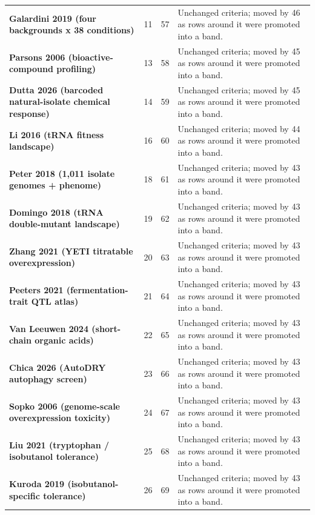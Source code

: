 \begin{longtable}{@{}L{46mm} r@{\hspace{6pt}} r@{\hspace{6pt}} L{104mm}@{}}
\addlinespace[5pt]
\textbf{Galardini 2019 (four backgrounds x 38 conditions)} & 11 & 57 & Unchanged criteria; moved by 46 as rows around it were promoted into a band. \\
\addlinespace[5pt]
\textbf{Parsons 2006 (bioactive-compound profiling)} & 13 & 58 & Unchanged criteria; moved by 45 as rows around it were promoted into a band. \\
\addlinespace[5pt]
\textbf{Dutta 2026 (barcoded natural-isolate chemical response)} & 14 & 59 & Unchanged criteria; moved by 45 as rows around it were promoted into a band. \\
\addlinespace[5pt]
\textbf{Li 2016 (tRNA fitness landscape)} & 16 & 60 & Unchanged criteria; moved by 44 as rows around it were promoted into a band. \\
\addlinespace[5pt]
\textbf{Peter 2018 (1,011 isolate genomes + phenome)} & 18 & 61 & Unchanged criteria; moved by 43 as rows around it were promoted into a band. \\
\addlinespace[5pt]
\textbf{Domingo 2018 (tRNA double-mutant landscape)} & 19 & 62 & Unchanged criteria; moved by 43 as rows around it were promoted into a band. \\
\addlinespace[5pt]
\textbf{Zhang 2021 (YETI titratable overexpression)} & 20 & 63 & Unchanged criteria; moved by 43 as rows around it were promoted into a band. \\
\addlinespace[5pt]
\textbf{Peeters 2021 (fermentation-trait QTL atlas)} & 21 & 64 & Unchanged criteria; moved by 43 as rows around it were promoted into a band. \\
\addlinespace[5pt]
\textbf{Van Leeuwen 2024 (short-chain organic acids)} & 22 & 65 & Unchanged criteria; moved by 43 as rows around it were promoted into a band. \\
\addlinespace[5pt]
\textbf{Chica 2026 (AutoDRY autophagy screen)} & 23 & 66 & Unchanged criteria; moved by 43 as rows around it were promoted into a band. \\
\addlinespace[5pt]
\textbf{Sopko 2006 (genome-scale overexpression toxicity)} & 24 & 67 & Unchanged criteria; moved by 43 as rows around it were promoted into a band. \\
\addlinespace[5pt]
\textbf{Liu 2021 (tryptophan / isobutanol tolerance)} & 25 & 68 & Unchanged criteria; moved by 43 as rows around it were promoted into a band. \\
\addlinespace[5pt]
\textbf{Kuroda 2019 (isobutanol-specific tolerance)} & 26 & 69 & Unchanged criteria; moved by 43 as rows around it were promoted into a band. \\

\end{longtable}

